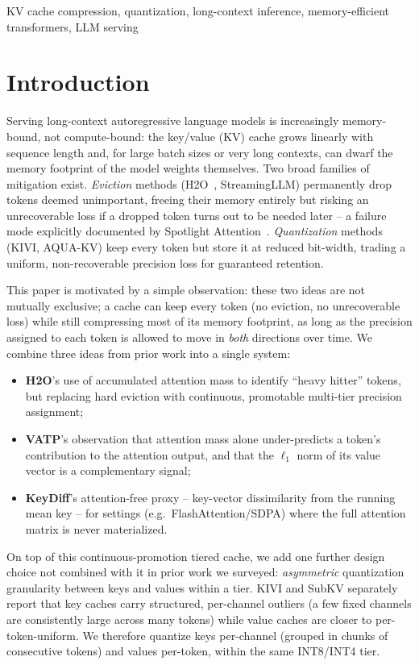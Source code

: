 \documentclass[conference]{IEEEtran}
\begin{document}
\begin{IEEEkeywords}
KV cache compression, quantization, long-context inference, memory-efficient transformers, LLM serving
\end{IEEEkeywords}

\section{Introduction}

Serving long-context autoregressive language models is increasingly memory-bound, not
compute-bound: the key/value (KV) cache grows linearly with sequence length and, for
large batch sizes or very long contexts, can dwarf the memory footprint of the model
weights themselves. Two broad families of mitigation exist. \emph{Eviction} methods
(H2O~\cite{h2o}, StreamingLLM) permanently drop tokens deemed unimportant, freeing their
memory entirely but risking an unrecoverable loss if a dropped token turns out to be
needed later -- a failure mode explicitly documented by Spotlight
Attention~\cite{spotlight}. \emph{Quantization} methods (KIVI, AQUA-KV) keep every token
but store it at reduced bit-width, trading a uniform, non-recoverable precision loss for
guaranteed retention.

This paper is motivated by a simple observation: these two ideas are not mutually
exclusive; a cache can keep every token (no eviction, no unrecoverable loss) while still
compressing most of its memory footprint, as long as the precision assigned to each
token is allowed to move in \emph{both} directions over time. We combine three ideas
from prior work into a single system:

\begin{itemize}
  \item \textbf{H2O}'s use of accumulated attention mass to identify ``heavy hitter''
  tokens, but replacing hard eviction with continuous, promotable multi-tier precision
  assignment;
  \item \textbf{VATP}'s observation that attention mass alone under-predicts a token's
  contribution to the attention output, and that the $\ell_1$ norm of its value vector is
  a complementary signal;
  \item \textbf{KeyDiff}'s attention-free proxy -- key-vector dissimilarity from the
  running mean key -- for settings (e.g.\ FlashAttention/SDPA) where the full attention
  matrix is never materialized.
\end{itemize}

On top of this continuous-promotion tiered cache, we add one further design choice not
combined with it in prior work we surveyed: \emph{asymmetric} quantization granularity
between keys and values within a tier. KIVI and SubKV separately report that key caches
carry structured, per-channel outliers (a few fixed channels are consistently large
across many tokens) while value caches are closer to per-token-uniform. We therefore
quantize keys per-channel (grouped in chunks of consecutive tokens) and values per-token,
within the same INT8/INT4 tier.
\end{document}
